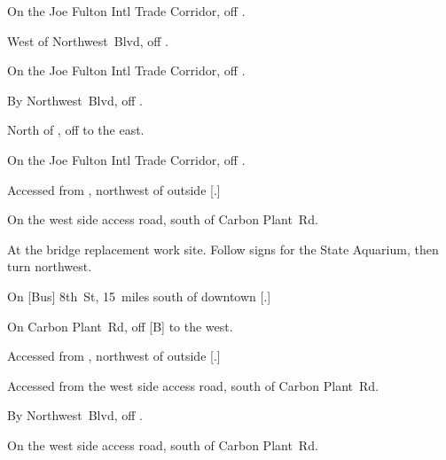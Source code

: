 
\begin{LocationList}

On the Joe Fulton Intl Trade Corridor, off  .

\Location{\GarageHQ \Garage}
West of  Northwest~Blvd, off .

On the Joe Fulton Intl Trade Corridor, off  .

By  Northwest~Blvd, off .

North of , off   to the east.

On the Joe Fulton Intl Trade Corridor, off  .

Accessed from , northwest of  outside [.]

\Location{\RecruitmentAgency \Recruitment}
On the west side  access road, south of Carbon Plant~Rd.

At the  bridge replacement work site. Follow signs for the State Aquarium, then turn northwest.

On [Bus] 8th~St, 15~miles south of downtown [.]

\Location{\TruckStop \Gas \Rest \Service}
On Carbon Plant~Rd, off  [B] to the west.

Accessed from , northwest of  outside [.]

Accessed from the west side  access road, south of Carbon Plant~Rd.

By  Northwest~Blvd, off .

On the west side  access road, south of Carbon Plant~Rd.

\end{LocationList}
